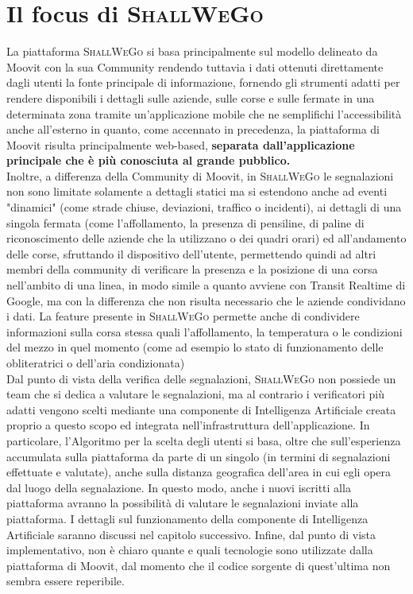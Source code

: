         

\newpage
\section{Il focus di \textsc{ShallWeGo}}
    La piattaforma \textsc{ShallWeGo} si basa principalmente sul modello delineato da Moovit con la sua Community rendendo tuttavia i dati ottenuti direttamente dagli utenti la fonte principale di informazione, fornendo gli strumenti adatti per rendere disponibili i dettagli sulle aziende, sulle corse e sulle fermate in una determinata zona tramite un'applicazione mobile che ne semplifichi l'accessibilità anche all'esterno in quanto, come accennato in precedenza, la piattaforma di Moovit risulta principalmente web-based, \textbf{separata dall'applicazione principale che è più conosciuta al grande pubblico.} \\
    Inoltre, a differenza della Community di Moovit, in \textsc{ShallWeGo} le segnalazioni non sono limitate solamente a dettagli statici ma si estendono anche ad eventi "dinamici" (come strade chiuse, deviazioni, traffico o incidenti), ai dettagli di una singola fermata (come l'affollamento, la presenza di pensiline, di paline di riconoscimento delle aziende che la utilizzano o dei quadri orari) ed all'andamento delle corse, sfruttando il dispositivo dell'utente, permettendo quindi ad altri membri della community di verificare la presenza e la posizione di una corsa nell'ambito di una linea, in modo simile a quanto avviene con Transit Realtime di Google, ma con la differenza che non risulta necessario che le aziende condividano i dati. La feature presente in \textsc{ShallWeGo} permette anche di condividere informazioni sulla corsa stessa quali l'affollamento, la temperatura o le condizioni del mezzo in quel momento (come ad esempio lo stato di funzionamento delle obliteratrici o dell'aria condizionata) \\
    Dal punto di vista della verifica delle segnalazioni, \textsc{ShallWeGo} non possiede un team che si dedica a valutare le segnalazioni, ma al contrario i verificatori più adatti vengono scelti mediante una componente di Intelligenza Artificiale creata proprio a questo scopo ed integrata nell'infrastruttura dell'applicazione. In particolare, l'Algoritmo per la scelta degli utenti si basa, oltre che sull'esperienza accumulata sulla piattaforma da parte di un singolo (in termini di segnalazioni effettuate e valutate), anche sulla distanza geografica dell'area in cui egli opera dal luogo della segnalazione. In questo modo, anche i nuovi iscritti alla piattaforma avranno la possibilità di valutare le segnalazioni inviate alla piattaforma. I dettagli sul funzionamento della componente di Intelligenza Artificiale saranno discussi nel capitolo successivo. Infine, dal punto di vista implementativo, non è chiaro quante e quali tecnologie sono utilizzate dalla piattaforma di Moovit, dal momento che il codice sorgente di quest'ultima non sembra essere reperibile.